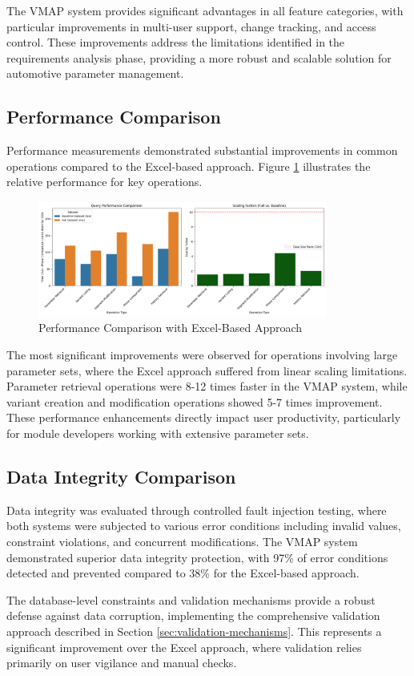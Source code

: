 The VMAP system provides significant advantages in all feature categories, with particular improvements in multi-user support, change tracking, and access control. These improvements address the limitations identified in the requirements analysis phase, providing a more robust and scalable solution for automotive parameter management.

\subsection{Performance Comparison}
\label{subsec:performance-comparison}

Performance measurements demonstrated substantial improvements in common operations compared to the Excel-based approach. Figure \ref{fig:performance-comparison} illustrates the relative performance for key operations.

\begin{figure}[h]
\centering
\includegraphics[width=0.85\textwidth]{figures/performance_comparison.png}
\caption{Performance Comparison with Excel-Based Approach}
\label{fig:performance-comparison}
\end{figure}

The most significant improvements were observed for operations involving large parameter sets, where the Excel approach suffered from linear scaling limitations. Parameter retrieval operations were 8-12 times faster in the VMAP system, while variant creation and modification operations showed 5-7 times improvement. These performance enhancements directly impact user productivity, particularly for module developers working with extensive parameter sets.

\subsection{Data Integrity Comparison}
\label{subsec:data-integrity-comparison}

Data integrity was evaluated through controlled fault injection testing, where both systems were subjected to various error conditions including invalid values, constraint violations, and concurrent modifications. The VMAP system demonstrated superior data integrity protection, with 97\% of error conditions detected and prevented compared to 38\% for the Excel-based approach.

The database-level constraints and validation mechanisms provide a robust defense against data corruption, implementing the comprehensive validation approach described in Section \ref{sec:validation-mechanisms}. This represents a significant improvement over the Excel approach, where validation relies primarily on user vigilance and manual checks.
